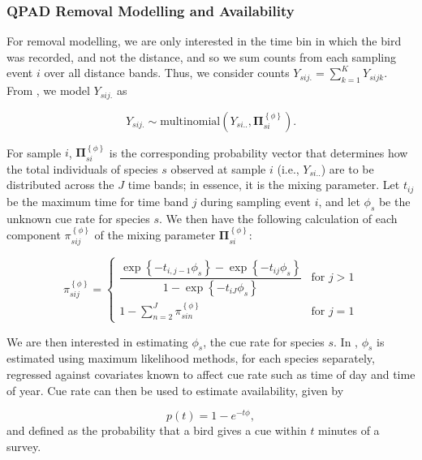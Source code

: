 \documentclass[12pt]{article}
\begin{document}
\subsubsection{QPAD Removal Modelling and Availability}
\par For removal modelling, we are only interested in the time bin in which the bird was recorded, and not the distance, and so we sum counts from each sampling event $i$ over all distance bands. 
Thus, we consider counts $Y_{sij.} = \sum_{k=1}^{K}{Y}_{sijk}$. 
From \citet{solymos_calibrating_2013}, we model $Y_{sij.}$ as

$${Y}_{sij.} \sim \mathrm{multinomial}\left({Y}_{si..}, \mathbf{\Pi}_{si}^{\left\{\phi\right\}}\right).$$

\par For sample $i$, $\mathbf{\Pi}_{si}^{\left\{\phi\right\}}$ is the corresponding probability vector that determines how the total individuals of species $s$ observed at sample $i$ (i.e., ${Y}_{si..}$) are to be distributed across the $J$ time bands; in essence, it is the mixing parameter.
Let $t_{ij}$ be the maximum time for time band $j$ during sampling event $i$, and let $\phi_s$ be the unknown cue rate for species $s$.
We then have the following calculation of each component $\pi_{sij}^{\left\{\phi\right\}}$ of the mixing parameter $\mathbf{\Pi}_{si}^{\left\{\phi\right\}}$:

\begin{equation}\label{eq:removal}
	\pi_{sij}^{\left\{\phi\right\}} = 
	\begin{cases}
		\dfrac{\exp\left\{ -t_{i,j-1}\phi_{s} \right\} - \exp\left\{ -t_{ij}\phi_{s} \right\}}{1 - \exp\left\{ -t_{iJ}\phi_{s} \right\}} & \text{for } j > 1 \\
		1 - \sum_{n = 2}^{J} \pi_{sin}^{\left\{\phi\right\}} & \text{for } j = 1
	\end{cases}
\end{equation}

\par We are then interested in estimating $\phi_s$, the cue rate for species $s$.
In \citep{solymos_calibrating_2013}, $\phi_s$ is estimated using maximum likelihood methods, for each species separately, regressed against covariates known to affect cue rate such as time of day and time of year.
Cue rate can then be used to estimate availability, given by

\begin{equation}\label{eq:availability}
	p(t) = 1 - e^{-t\phi},
\end{equation}
and defined as the probability that a bird gives a cue within $t$ minutes of a survey.
\end{document}
